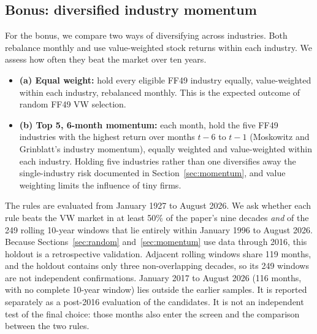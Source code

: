 \documentclass[11pt,letterpaper]{article}
\newcommand{\tablefont}{\footnotesize\setlength{\tabcolsep}{3.4pt}}
\begin{document}
\subsection{Bonus: diversified industry momentum}

For the bonus, we compare two ways of diversifying across industries. Both rebalance monthly and use
value-weighted stock returns within each industry. We assess how often they beat the market over ten years.
\begin{itemize}
  \item \textbf{(a) Equal weight:} hold every eligible FF49 industry equally, value-weighted within each industry,
    rebalanced monthly. This is the expected outcome of random FF49 VW selection.
  \item \textbf{(b) Top 5, 6-month momentum:} each month, hold the five FF49 industries with the highest return over
    months $t-6$ to $t-1$ (Moskowitz and Grinblatt's industry momentum), equally weighted and value-weighted within
    each industry. Holding five industries rather than one diversifies away the single-industry risk documented in
    Section~\ref{sec:momentum}, and value weighting limits the influence of tiny firms.
\end{itemize}
The rules are evaluated from January 1927 to August 2026. We ask whether each rule beats the VW
market in at least 50\% of the paper's nine decades \emph{and} of the 249 rolling 10-year windows that lie entirely
within January 1996 to August 2026. Because Sections~\ref{sec:random} and~\ref{sec:momentum} use data through 2016,
this holdout is a retrospective validation. Adjacent rolling windows share 119 months, and the holdout contains only
three non-overlapping decades, so its 249 windows are not independent confirmations. January 2017 to August 2026
(116 months, with no complete 10-year window) lies outside the earlier samples. It is reported separately as a
post-2016 evaluation of the candidates. It is not an independent test of the final choice: those months
also enter the screen and the comparison between the two rules.

\begin{table}[!htbp]
  \centering\tablefont
  \caption{Win rates against the VW market over 10-year windows (strictly higher holding return), before costs.
    The two rows marked ``screen'' form the pass/fail criterion.}
  \label{tab:screen}
  
\end{table}

\begin{table}[!htbp]
  \centering\tablefont
  \caption{Performance by period, before costs. Wealth is per \$1. Return and volatility are annualized (\%).
    Turnover is one-way across industries (\% a year). Jan 2017--Aug 2026 is the post-2016 evaluation period (116 months).}
  \label{tab:ruleperf}
  
\end{table}
\end{document}
